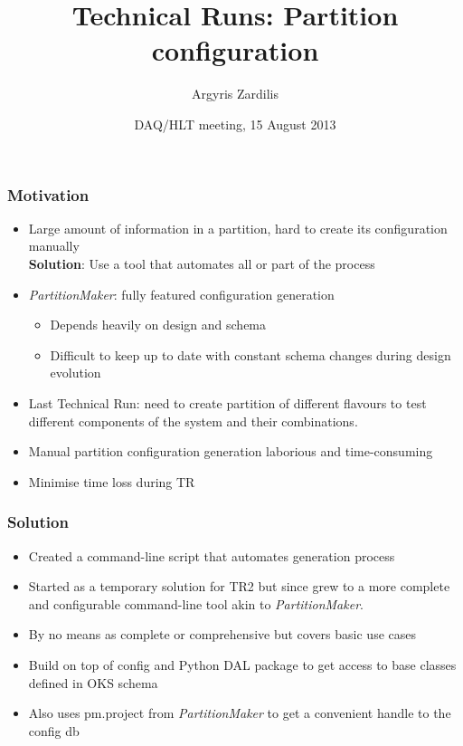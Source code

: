 \documentclass{beamer}
\title
{Technical Runs: Partition configuration}
\author[Argyris Zardilis]
{Argyris Zardilis \inst{}}
\institute[CERN]
{
  \inst{}
  CERN
}
\date[DAQ/HLT meeting, 15/08/2013]
{DAQ/HLT meeting, 15 August 2013}
\begin{document}
\frame{\titlepage}

\begin{frame}
  \frametitle{Motivation}
  \begin{itemize}
    \item Large amount of information in a partition, hard to create its configuration manually \\
      \textbf{Solution}: Use a tool that automates all or part of the process

    \item \textit{PartitionMaker}: fully featured configuration generation
      \begin{itemize}
        \item Depends heavily on design and schema
        

        \item Difficult to keep up to date with constant schema changes during design evolution
      \end{itemize}


    \item Last Technical Run: need to create partition of different flavours to test different components
      of the system and their combinations.

    \item Manual partition configuration generation laborious and time-consuming

    \item Minimise time loss during TR
  \end{itemize}
  
\end{frame}


\begin{frame}
  \frametitle{Solution}
  \begin{itemize}
    \item Created a command-line script that automates generation process

    \item Started as a temporary solution for TR2 but since grew to a more complete
      and configurable command-line tool akin to \textit{PartitionMaker}.

    \item By no means as complete or comprehensive but covers basic use cases

    \item Build on top of config and Python DAL package to get access to base classes defined in OKS schema 

    \item Also uses pm.project from \textit{PartitionMaker} to get a convenient handle to the config db

  \end{itemize}
\end{frame}
\end{document}
